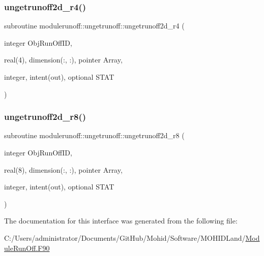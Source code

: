 \subsubsection{\texorpdfstring{ungetrunoff2d\+\_\+r4()}{ungetrunoff2d\_r4()}}
{\footnotesize\ttfamily subroutine modulerunoff\+::ungetrunoff\+::ungetrunoff2d\+\_\+r4 (\begin{DoxyParamCaption}\item[{integer}]{Obj\+Run\+Off\+ID,  }\item[{real(4), dimension(\+:, \+:), pointer}]{Array,  }\item[{integer, intent(out), optional}]{S\+T\+AT }\end{DoxyParamCaption})\hspace{0.3cm}{\ttfamily [private]}}

\mbox{\label{interfacemodulerunoff_1_1ungetrunoff_ad30fb1766888572f8c792b40853b2b30}} 
\subsubsection{\texorpdfstring{ungetrunoff2d\+\_\+r8()}{ungetrunoff2d\_r8()}}
{\footnotesize\ttfamily subroutine modulerunoff\+::ungetrunoff\+::ungetrunoff2d\+\_\+r8 (\begin{DoxyParamCaption}\item[{integer}]{Obj\+Run\+Off\+ID,  }\item[{real(8), dimension(\+:, \+:), pointer}]{Array,  }\item[{integer, intent(out), optional}]{S\+T\+AT }\end{DoxyParamCaption})\hspace{0.3cm}{\ttfamily [private]}}



The documentation for this interface was generated from the following file\+:\begin{DoxyCompactItemize}
\item 
C\+:/\+Users/administrator/\+Documents/\+Git\+Hub/\+Mohid/\+Software/\+M\+O\+H\+I\+D\+Land/\mbox{\hyperlink{_module_run_off_8_f90}{Module\+Run\+Off.\+F90}}\end{DoxyCompactItemize}
